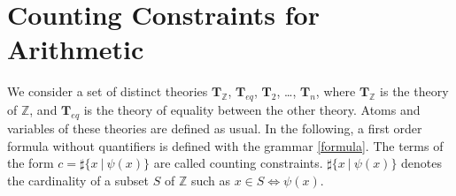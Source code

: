 \documentclass[]{article}
\begin{document}



%

\section{Counting Constraints for Arithmetic}

We consider a set of distinct theories $\mathbf{T}_\mathbb{Z}$,
$\mathbf{T}_{eq}$, $\mathbf{T}_2$, \ldots{}, $\mathbf{T}_n$, where
$\mathbf{T}_\mathbb{Z}$ is the theory of $\mathbb{Z}$, and
$\mathbf{T}_{eq}$ is the theory of equality between the other theory.
Atoms and variables of these theories are defined as usual. In the
following, a first order formula without quantifiers is defined with the
grammar \ref{formula}. The terms of the form
$c = \sharp\{ x\ |\ \psi(x) \}$ are called counting constraints. 
$\sharp\{ x\ |\ \psi(x)\}$ denotes the cardinality of a subset $S$
of $\mathbb{Z}$ such as $x \in S \iff \psi(x)$.
\end{document}
